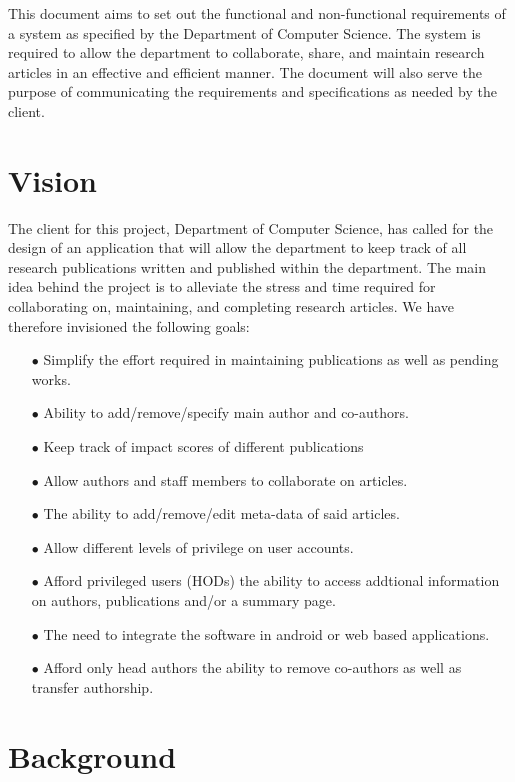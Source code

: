 \documentclass[a4paper,12pt]{article}
\begin{document}
This document aims to set out the functional and non-functional requirements of a system as specified by the Department of Computer Science. The system is required to allow the department to collaborate, share, and maintain research articles in an effective and efficient manner. The document will also serve the purpose of communicating the requirements and specifications as needed by the client.

\newpage
\section{Vision}

The client for this project, Department of Computer Science, has called for the design of an application that will allow the department to keep track of all research publications written and published within the department. The main idea behind the project is to alleviate the stress and time required for collaborating on, maintaining, and completing research articles. We have therefore invisioned the following goals:

	\begin{itemize}
		\item[$\bullet$] Simplify the effort required in maintaining publications as well as pending works.
		\item[$\bullet$] Ability to add/remove/specify main author and co-authors.
		\item[$\bullet$] Keep track of impact scores of different publications
		\item[$\bullet$] Allow authors and staff members to collaborate on articles.
		\item[$\bullet$] The ability to add/remove/edit meta-data of said articles.
		\item[$\bullet$] Allow different levels of privilege on user accounts.
		\item[$\bullet$] Afford privileged users (HODs) the ability to access addtional information on authors, publications and/or a summary page.  
		\item[$\bullet$] The need to integrate the software in android or web based applications.
		\item[$\bullet$] Afford only head authors the ability to remove co-authors as well as transfer authorship.
	\end{itemize}
	
\newpage
\section{Background}
\end{document}
